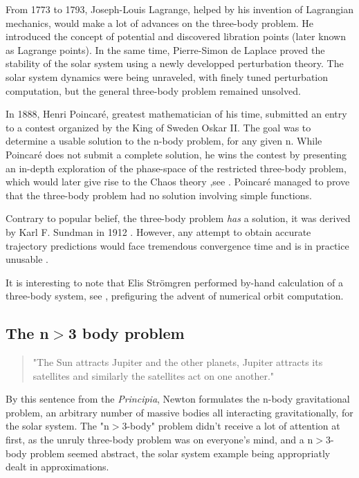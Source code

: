 From 1773 to 1793, Joseph-Louis Lagrange, helped by his invention of Lagrangian mechanics, would make a lot of advances on the three-body problem. He introduced the concept of potential and discovered libration points (later known as Lagrange points). In the same time, Pierre-Simon de Laplace proved the stability of the solar system using a newly developped perturbation theory. The solar system dynamics were being unraveled, with finely tuned perturbation computation, but the general three-body problem remained unsolved.

In 1888, Henri Poincaré, greatest mathematician of his time, submitted an entry to a contest organized by the King of Sweden Oskar II. The goal was to determine a usable solution to the n-body problem, for any given n. While Poincaré does not submit a complete solution, he wins the contest by presenting an in-depth exploration of the phase-space of the restricted three-body problem, which would later give rise to the Chaos theory ,see \cite{Yoccoz2010}. Poincaré managed to prove that the three-body problem had no  solution involving simple functions.

Contrary to popular belief, the three-body problem \textit{has} a solution, it was derived by Karl F. Sundman in 1912 \citep{Sundman1912}. However, any attempt to obtain accurate trajectory predictions would face tremendous convergence time and is in practice unusable \citep{Beloriszky1930}.

It is interesting to note that Elis Str\"omgren performed by-hand calculation of a three-body system, see \cite{Aarseth2003,Stromgren1909}, prefiguring the advent of numerical orbit computation.

\subsection{The n$>$3 body problem}

\begin{quote}
"The Sun attracts Jupiter and the other planets, Jupiter attracts its satellites and similarly the satellites act on one another."
\end{quote}

By this sentence from the \textit{Principia}, Newton formulates the n-body gravitational problem, an arbitrary number of massive bodies all interacting gravitationally, for the solar system. The "n$>$3-body" problem didn't receive a lot of attention at first, as the unruly three-body problem was on everyone's mind, and a n$>$3-body problem seemed abstract, the solar system example being appropriatly dealt in approximations.

